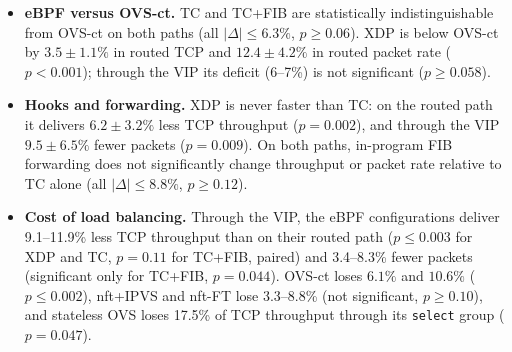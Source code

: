 \documentclass[conference]{IEEEtran}
\begin{document}
\begin{itemize}
VIP (all $p \le 0.046$); TC is 12.6--21.0\% below it ($p \le 0.012$) and
XDP 21.1--25.0\% ($p<0.001$). The
flowtable resolves an established flow, including its NAT binding and output
interface, with one lookup at the ingress hook and then skips routing,
connection tracking and the forward chain, whereas the eBPF pipeline still
evaluates the firewall, connection, NAT and telemetry tables for every
packet. The advantage of TC+FIB over nft+IPVS therefore comes mostly from
bypassing the forwarding path, which the kernel can also do: the flowtable
raises nftables' own throughput by $48.2 \pm 13.8\%$ over nft+IPVS.
\item \textbf{eBPF versus OVS-ct.} TC and TC+FIB are statistically
indistinguishable from OVS-ct on both paths (all $|\Delta| \le 6.3\%$,
$p \ge 0.06$). XDP is below OVS-ct by $3.5 \pm 1.1\%$ in routed TCP and
$12.4 \pm 4.2\%$ in routed packet rate ($p<0.001$); through the VIP its
deficit (6--7\%) is not significant ($p \ge 0.058$).
\item \textbf{Hooks and forwarding.} XDP is never faster than TC: on the
routed path it delivers $6.2 \pm 3.2\%$ less TCP throughput ($p=0.002$), and
through the VIP $9.5 \pm 6.5\%$ fewer packets ($p=0.009$). On both paths,
in-program FIB forwarding does not significantly change throughput or packet
rate relative to TC alone (all $|\Delta| \le 8.8\%$, $p \ge 0.12$).
\item \textbf{Cost of load balancing.} Through the VIP, the eBPF
configurations deliver 9.1--11.9\% less TCP throughput than on their routed
path ($p \le 0.003$ for XDP and TC, $p=0.11$ for TC+FIB, paired) and
3.4--8.3\% fewer packets (significant only for TC+FIB, $p=0.044$). OVS-ct
loses $6.1\%$ and $10.6\%$ ($p \le 0.002$), nft+IPVS and nft-FT lose
3.3--8.8\% (not significant, $p \ge 0.10$), and stateless OVS loses 17.5\% of
TCP throughput through its \texttt{select} group ($p=0.047$).
\end{itemize}
\end{document}
